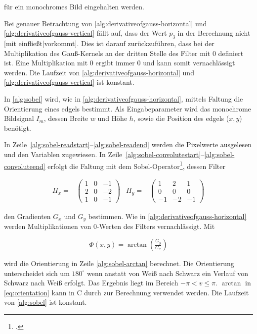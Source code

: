 für ein monochromes Bild eingehalten werden.

Bei genauer Betrachtung von \autoref{alg:derivativeofgauss-horizontal} und \autoref{alg:derivativeofgauss-vertical}
 fällt auf, dass der Wert $p_3$ in der Berechnung nicht [mit einfließt|vorkommt]. Dies ist darauf zurückzuführen, dass bei der
 Multiplikation des Gauß-Kernels an der dritten Stelle des Filter mit $0$ definiert ist. Eine Multiplikation mit $0$
 ergibt immer $0$ und kann somit vernachlässigt werden. Die Laufzeit von \autoref{alg:derivativeofgauss-horizontal} und
 \autoref{alg:derivativeofgauss-vertical} ist konstant.

In \autoref{alg:sobel} wird, wie in \autoref{alg:derivativeofgauss-horizontal}, mittels Faltung die Orientierung eines
 \glspl{edgel} bestimmt. Als Eingabeparameter wird das monochrome Bildsignal $I_m$, dessen Breite $w$ und Höhe $h$,
 sowie die Position des \glspl{edgel} ($x,y$) benötigt.



In Zeile~\ref{alg:sobel-readstart}--\ref{alg:sobel-readend} werden die Pixelwerte ausgelesen und den Variablen
 zugewiesen. In Zeile~\ref{alg:sobel-convolutestart}--\ref{alg:sobel-convoluteend} erfolgt die Faltung mit dem
 Sobel-Operator\footcite[Vgl.][S.~120--123]{burger05}, dessen Filter

\begin{subequations}
\begin{align}
	H_x =&
	\begin{pmatrix}
		1& 0& -1\\
		2& 0& -2\\
		1& 0& -1
	\end{pmatrix}
\end{align}
\begin{align}
	H_y =&
	\begin{pmatrix}
		1& 2& 1\\
		0& 0& 0\\
		-1& -2& -1
	\end{pmatrix}
\end{align}
\end{subequations}

den Gradienten $G_x$ und $G_y$ bestimmen. Wie in \autoref{alg:derivativeofgauss-horizontal} werden Multiplikationen von
 $0$-Werten des Filters vernachlässigt. Mit

\begin{equation}
	\label{eq:orientation}
	\Phi(x,y) = \arctan{\left(\tfrac{G_y}{G_x}\right)}
\end{equation}

wird die Orientierung in Zeile \autoref{alg:sobel-arctan} berechnet. Die Orientierung unterscheidet sich um $180^\circ$
 wenn anstatt von Weiß nach Schwarz ein Verlauf von Schwarz nach Weiß erfolgt. Das Ergebnis liegt im Bereich
 $-\pi < v \leq \pi$. $\arctan$ in \autoref{eq:orientation} kann in C durch  zur Berechnung verwendet
 werden. Die Laufzeit von \autoref{alg:sobel} ist konstant.


